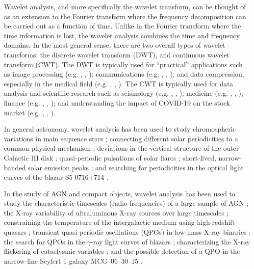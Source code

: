 \documentclass[fleqn,usenatbib]{mnras}
\begin{document}
Wavelet analysis, and more specifically the wavelet transform, can be thought of as an extension to the Fourier transform where the frequency decomposition can be carried out as a function of time.  Unlike in the Fourier transform where the time information is lost, the wavelet analysis combines the time and frequency domains. In the most general sense, there are two overall types of wavelet transforms: the discrete wavelet transform (DWT), and continuous wavelet transform (CWT). The DWT is typically used for ``practical'' applications such as image processing (e.g. \citealt{broughton1998wavelet_dwt_imageprocessing}, \citealt{chang2007direction_dwt_imageprocessing}, \citealt{chervyakov_dwt_imageprocessing}); communications (e.g. \citealt{akansu1998orthogonal_dwt_comms}, \citealt{saad2010_dwt_comms}, \citealt{baig2018_dwt_comms}); and data compression, especially in the medical field (e.g. \citealt{badawy2002mri_dwt_datacomp}, \citealt{qu2003_dwt_datacomp}, \citealt{jha2021empirical_dwt_datacomp}). The CWT is typically used for data analysis and scientific research such as seismology (e.g. \citealt{li2009evaluation_cwt_seis}, \citealt{karamzadeh2012_cwt_seis}, \citealt{balafas2015_cwt_seis}); medicine (e.g. \citealt{bostanov2004bci_cwt_med}, \citealt{cheng2010_cwt_med}, \citealt{komorowski2016_cwt_med}); finance (e.g. \citealt{kristoufek2013_cwt_finance}, \citealt{olayeni2016_cwt_finance}, \citealt{tiwari2016_cwt_finance}); and understanding the impact of COVID-19 on the stock market (e.g. \citealt{caferra2021_cwt_stocks}, \citealt{goodell2021covid_btc_cwt_stocks}, \citealt{umar2022covid_cwt_stocks}).

In general astronomy, wavelet analysis has been used to study chromospheric variations in main sequence stars \citep{frick1997wavelet}; connecting different solar periodicities to a common physical mechanism \citep{krivova2002_solar_cwt}; deviations in the vertical structure of the outer Galactic HI disk \citep{levine2006_vertical_galactic_HI_cwt}; quasi-periodic pulsations of solar flares \citep{dominique2018detection_solar_flares_cwt}; short-lived, narrow-banded solar emission peaks \citep{suresh2017wavelet}; and searching for periodicities in the optical light curves of the blazar S5 0716+714 \citep{gupta2008periodic_optical}.

In the study of AGN and compact objects, wavelet analysis has been used to study the characteristic timescales (radio frequencies) of a large sample of AGN \citep{hovatta2008wavelet}; the X-ray variability of ultraluminous X-ray sources over large timescales \citep{lin2015longterm_ulxs}; constraining the temperature of the intergalactic medium using high-redshift quasars \citep{wolfson2021_igm_temp_cwt}; transient quasi-periodic oscillations (QPOs) in low-mass X-ray binaries \citep{chen2022wavelet}; the search for QPOs in the $\gamma$-ray light curves of blazars \citep{ren2022quasi}; characterizing the X-ray flickering of cataclysmic variables \citep{anzolin2010wavelet}; and the possible detection of a QPO in the narrow-line Seyfert 1 galaxy MCG–06–30–15 \citep{gupta2018_qpo}.
\end{document}
